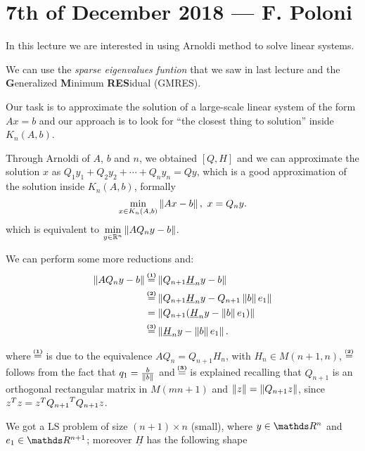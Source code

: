 \documentclass[ComputationalMathematics.tex]{subfiles}
\begin{document}
\section{7th of December 2018 --- F. Poloni}
In this lecture we are interested in using Arnoldi method to solve linear systems.

We can use the \emph{sparse eigenvalues funtion} that we saw in last lecture and the \textbf{G}eneralized \textbf{M}inimum \textbf{RES}idual (GMRES).

Our task is to approximate the solution of a large-scale linear system of the form $Ax=b$ and our approach is to look for ``the closest thing to solution'' inside $K_n(A,b)$.

Through Arnoldi of $A$, $b$ and $n$, we obtained $[Q, H]$ and we can approximate the solution $x$ as $Q_1y_1 + Q_2 y_2 + \cdots + Q_n y_n = Qy$, which is a good approximation of the solution inside $K_{n}(A, b)$, formally
\[
  \min\limits_{x \in K_{n}(A, b)} \left\lVert Ax-b\right\rVert,~ x = Q_n y.
\]
which is equivalent to $\min\limits_{y\in\mathbb{R}^n} \left\lVert AQ_n y - b\right\rVert$.

We can perform some more reductions and:
\begin{equation}
  \begin{aligned}
    \norm{AQ_n y - b} &\numeq{(1)} \norm{Q_{n+1}\underline{H}_n y - b}\\
    &\numeq{(2)}
    \norm{
      Q_{n+1} {\underline{H}}_n y - Q_{n+1} \norm{b} e_1}\\
    &=
    \norm{
      Q_{n+1} ({\underline{H}}_n y - \norm{b} e_1)}\\
    &\numeq{(3)}
    \norm{\underline{H}_n y - \norm{b}e_1}.
  \end{aligned}
\end{equation}

where $\numeq{(1)}$ is due to the equivalence $AQ_n = Q_{n+1}H_n$, with $H_n \in M(n+1, n)$, $\numeq{(2)}$ follows from the fact that $q_1 = \frac{b}{\left\lVert b\right\rVert}$ and $\numeq{(3)}$ is explained recalling that $Q_{n+1}$ is an orthogonal rectangular matrix in $M(m n+1)$ and $\left\lVert z\right\rVert = \left\lVert Q_{n+1}z\right\rVert$, since ${z}^{T}z = {z}^{T}{Q_{n+1}}^{T}Q_{n+1}z$.

We got a LS problem of size $(n+1)\times n$ (small), where $y \in \R^n$ and $e_1 \in \R^{n+1}$; moreover $\underline{H}$ has the following shape
\end{document}
